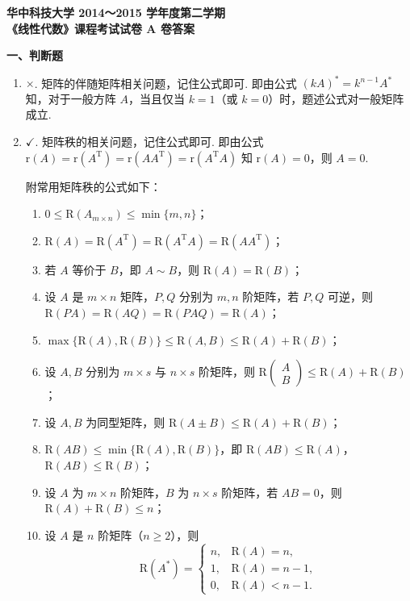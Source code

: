 \documentclass[a4paper,11pt]{ctexart}
\newcommand{\rk}{\mathrm{r}}
\newcommand{\R}{\mathrm{R}}
\newcommand{\T}{\mathrm{T}}
\begin{document}
\begin{center}
  {\Large\bfseries 华中科技大学 2014～2015 学年度第二学期}\\[0.4em]
  {\Large\bfseries 《线性代数》课程考试试卷 A 卷答案}
\end{center}

\vspace{0.8em}

\textbf{一、判断题}

\begin{enumerate}[label=\arabic*., leftmargin=2em, itemsep=0.7em, topsep=0.5em]
  \item $\times$. 矩阵的伴随矩阵相关问题，记住公式即可. 即由公式 $(kA)^* = k^{n-1} A^*$ 知，对于一般方阵 $A$，当且仅当 $k = 1$（或 $k = 0$）时，题述公式对一般矩阵成立.

  \item $\checkmark$. 矩阵秩的相关问题，记住公式即可. 即由公式 $\rk(A) = \rk(A^{\T}) = \rk(AA^{\T}) = \rk(A^{\T}A)$ 知 $\rk(A) = 0$，则 $A = 0$.

  附常用矩阵秩的公式如下：
  \begin{enumerate}[label=(\arabic*), leftmargin=2.2em, itemsep=0.35em, topsep=0.4em]
    \item $0 \leqslant \R(A_{m \times n}) \leqslant \min\{m, n\}$；
    \item $\R(A) = \R(A^{\T}) = \R(A^{\T}A) = \R(AA^{\T})$；
    \item 若 $A$ 等价于 $B$，即 $A \sim B$，则 $\R(A) = \R(B)$；
    \item 设 $A$ 是 $m \times n$ 矩阵，$P, Q$ 分别为 $m, n$ 阶矩阵，若 $P, Q$ 可逆，则 $\R(PA) = \R(AQ) = \R(PAQ) = \R(A)$；
    \item $\max\{\R(A), \R(B)\} \leqslant \R(A, B) \leqslant \R(A) + \R(B)$；
    \item 设 $A, B$ 分别为 $m \times s$ 与 $n \times s$ 阶矩阵，则 $\R\begin{pmatrix} A \\ B \end{pmatrix} \leqslant \R(A) + \R(B)$；
    \item 设 $A, B$ 为同型矩阵，则 $\R(A \pm B) \leqslant \R(A) + \R(B)$；
    \item $\R(AB) \leqslant \min\{\R(A), \R(B)\}$，即 $\R(AB) \leqslant \R(A)$，$\R(AB) \leqslant \R(B)$；
    \item 设 $A$ 为 $m \times n$ 阶矩阵，$B$ 为 $n \times s$ 阶矩阵，若 $AB = 0$，则 $\R(A) + \R(B) \leqslant n$；
    \item 设 $A$ 是 $n$ 阶矩阵（$n \geqslant 2$），则
    \[
      \R(A^*) = \begin{cases}
        n, & \R(A) = n, \\
        1, & \R(A) = n - 1, \\
        0, & \R(A) < n - 1.
      \end{cases}
    \]
  \end{enumerate}


\end{enumerate}
\end{document}
